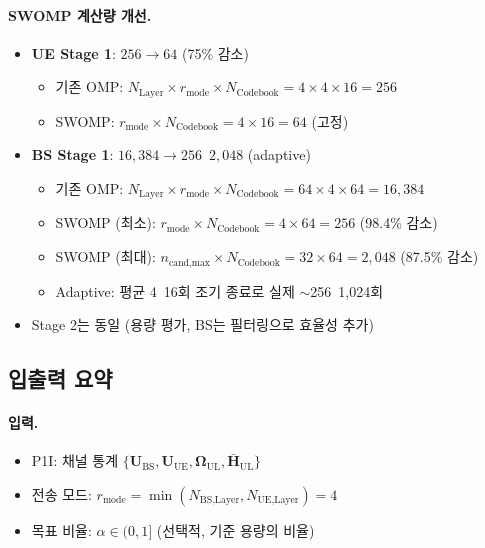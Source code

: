 \documentclass[10pt]{article}
\begin{document}
\paragraph{SWOMP 계산량 개선.}
\begin{itemize}
    \item \textbf{UE Stage 1}: $256 \rightarrow 64$ (75\% 감소)
    \begin{itemize}
        \item 기존 OMP: $N_{\text{Layer}} \times r_{\text{mode}} \times N_{\text{Codebook}} = 4 \times 4 \times 16 = 256$
        \item SWOMP: $r_{\text{mode}} \times N_{\text{Codebook}} = 4 \times 16 = 64$ (고정)
    \end{itemize}
    \item \textbf{BS Stage 1}: $16{,}384 \rightarrow 256$~$2{,}048$ (adaptive)
    \begin{itemize}
        \item 기존 OMP: $N_{\text{Layer}} \times r_{\text{mode}} \times N_{\text{Codebook}} = 64 \times 4 \times 64 = 16{,}384$
        \item SWOMP (최소): $r_{\text{mode}} \times N_{\text{Codebook}} = 4 \times 64 = 256$ (98.4\% 감소)
        \item SWOMP (최대): $n_{\text{cand,max}} \times N_{\text{Codebook}} = 32 \times 64 = 2{,}048$ (87.5\% 감소)
        \item Adaptive: 평균 4~16회 조기 종료로 실제 $\sim$256~1,024회
    \end{itemize}
    \item Stage 2는 동일 (용량 평가, BS는 필터링으로 효율성 추가)
\end{itemize}

\subsection{입출력 요약}

\paragraph{입력.}
\begin{itemize}
    \item P1I: 채널 통계 $\{\mathbf{U}_{\text{BS}}, \mathbf{U}_{\text{UE}}, \boldsymbol{\Omega}_{\text{UL}}, \bar{\mathbf{H}}_{\text{UL}}\}$
    \item 전송 모드: $r_{\text{mode}} = \min(N_{\text{BS,Layer}}, N_{\text{UE,Layer}}) = 4$
    \item 목표 비율: $\alpha \in (0, 1]$ (선택적, 기준 용량의 비율)
\end{itemize}
\end{document}

